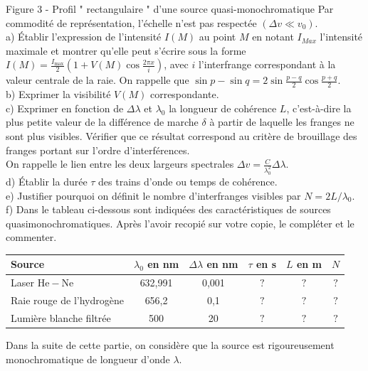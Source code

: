 \documentclass[10pt]{article}
\begin{document}
Figure 3 - Profil " rectangulaire " d'une source quasi-monochromatique Par commodité de représentation, l'échelle n'est pas respectée \(\left(\Delta v \ll v_{0}\right)\).\\
a) Établir l'expression de l'intensité \(I(M)\) au point \(M\) en notant \(I_{M a x}\) l'intensité maximale et montrer qu'elle peut s'écrire sous la forme \(I(M)=\frac{I_{\max }}{2}\left(1+V(M) \cos \frac{2 \pi x}{i}\right)\), avec \(i\) l'interfrange correspondant à la valeur centrale de la raie. On rappelle que \(\sin p-\sin q=2 \sin \frac{p-q}{2} \cos \frac{p+q}{2}\).\\
b) Exprimer la visibilité \(V(M)\) correspondante.\\
c) Exprimer en fonction de \(\Delta \lambda\) et \(\lambda_{0}\) la longueur de cohérence \(L\), c'est-à-dire la plus petite valeur de la différence de marche \(\delta\) à partir de laquelle les franges ne sont plus visibles. Vérifier que ce résultat correspond au critère de brouillage des franges portant sur l'ordre d'interférences.\\
On rappelle le lien entre les deux largeurs spectrales \(\Delta v=\frac{C}{\lambda_{0}^{2}} \Delta \lambda\).\\
d) Établir la durée \(\tau\) des trains d'onde ou temps de cohérence.\\
e) Justifier pourquoi on définit le nombre d'interfranges visibles par \(N=2 L / \lambda_{0}\).\\
f) Dans le tableau ci-dessous sont indiquées des caractéristiques de sources quasimonochromatiques. Après l'avoir recopié sur votre copie, le compléter et le commenter.

\begin{center}
\begin{tabular}{|l|c|c|c|c|c|}
\hline
Source & \(\lambda_{0}\) en nm & \(\Delta \lambda\) en nm & \(\tau\) en s & \(L\) en m & \(N\) \\
\hline
Laser \(\mathrm{He}-\mathrm{Ne}\) & 632,991 & 0,001 & \(?\) & \(?\) & \(?\) \\
\hline
Raie rouge de l'hydrogène & 656,2 & 0,1 & \(?\) & \(?\) & \(?\) \\
\hline
Lumière blanche filtrée & 500 & 20 & \(?\) & \(?\) & \(?\) \\
\hline
\end{tabular}
\end{center}

Dans la suite de cette partie, on considère que la source est rigoureusement monochromatique de longueur d'onde \(\lambda\).
\end{document}
